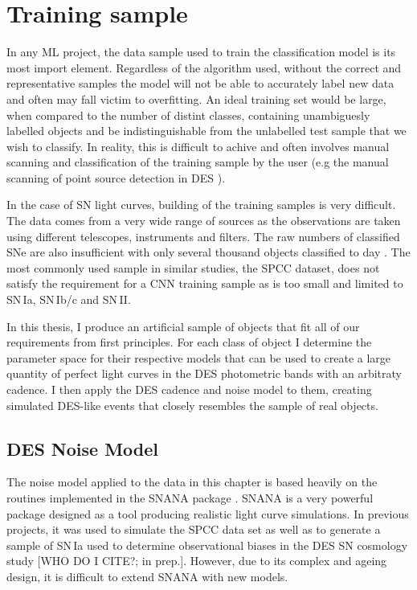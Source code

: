 \section{Training sample} \label{sec:TrainingSample}
In any ML project, the data sample used to train the classification model is its most import element. Regardless of the algorithm used, without the correct and representative samples the model will not be able to accurately label new data and often may fall victim to overfitting. An ideal training set would be large, when compared to the number of distint classes, containing unambiguesly labelled objects and be indistinguishable from the unlabelled test sample that we wish to classify. In reality, this is difficult to achive and often involves manual scanning and classification of the training sample by the user (e.g the manual scanning of point source detection in DES \citep[][and similar studies]{Goldstein2015}).

In the case of SN light curves, building of the training samples is very difficult. The data comes from a very wide range of sources as the observations are taken using different telescopes, instruments and filters. The raw numbers of classified SNe are also insufficient with only several thousand objects classified to day \citep{Alsabti2017}. The  most commonly used sample in similar studies, the SPCC dataset, does not satisfy the requirement for a CNN training sample as is too small and limited to SN\,Ia, SN\,Ib/c and SN\,II.

In this thesis, I produce an artificial sample of objects that fit all of our requirements from first principles. For each class of object I determine the parameter space for their respective models that can be used to create a large quantity of perfect light curves in the DES photometric bands with an arbitraty cadence. I then apply the DES cadence and noise model to them, creating simulated DES-like events that closely resembles the sample of real objects.

\subsection{DES Noise Model} \label{sec:NoiseModel}
The noise model applied to the data in this chapter is based heavily on the routines implemented in the SNANA package \citep{Kessler2009}. SNANA is a very powerful package designed as a tool producing realistic light curve simulations. In previous projects, it was used to simulate the SPCC data set \citep{Kessler2010} as well as to generate a sample of SN\,Ia used to determine observational biases in the DES SN cosmology study [WHO DO I CITE?; in prep.]. However, due to its complex and ageing design, it is difficult to extend SNANA with new models.

